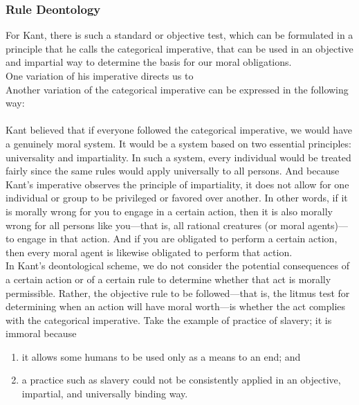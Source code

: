 \documentclass[12pt]{article}
\theoremstyle{definition}
\begin{document}
\subsubsection{Rule Deontology}
For Kant, there is such a standard or objective test,
which can be formulated in a principle that he calls the categorical imperative, that can be used in an objective and impartial way to determine
the basis for our moral obligations.\\ 
One variation of his imperative directs us to\\
Another variation of the categorical imperative can be expressed in the following way:\\
\\
Kant believed that if everyone followed the categorical imperative, we would have a
genuinely moral system. It would be a system based on two essential principles:
universality and impartiality. In such a system, every individual would be treated fairly
since the same rules would apply universally to all persons. And because Kant’s
imperative observes the principle of impartiality, it does not allow for one individual
or group to be privileged or favored over another. In other words, if it is morally wrong
for you to engage in a certain action, then it is also morally wrong for all persons like
you—that is, all rational creatures (or moral agents)—to engage in that action. And if you
are obligated to perform a certain action, then every moral agent is likewise obligated to
perform that action.\\
In Kant’s deontological scheme, we do not consider the potential consequences of a
certain action or of a certain rule to determine whether that act is morally permissible.
Rather, the objective rule to be followed—that is, the litmus test for determining when an
action will have moral worth—is whether the act complies with the categorical imperative. Take the example of practice of slavery; it is immoral because
\begin{enumerate}
\item it allows some humans to be used only as a means to an end; and
\item a practice such as slavery could not be consistently applied in an objective,
impartial, and universally binding way.
\end{enumerate}
\end{document}
